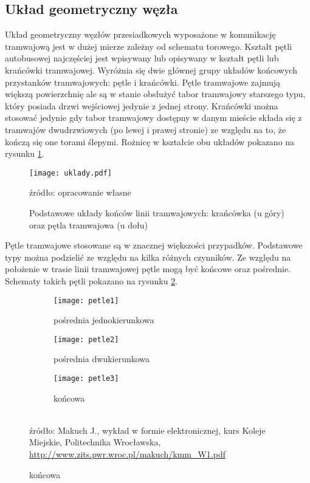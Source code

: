 \documentclass[twoside,12pt]{article}
\begin{document}
	\clearpage
	\subsection{Układ geometryczny węzła}
	
	Układ geometryczny węzłów przesiadkowych wyposażone w komunikację tramwajową jest w dużej mierze zależny od schematu torowego. Kształt pętli autobusowej najczęściej jest wpisywany lub opisywany w kształt pętli lub krańcówki tramwajowej. Wyróżnia się dwie głównej grupy układów końcowych przystanków tramwajowych: pętle i krańcówki. Pętle tramwajowe zajmują większą powierzchnię ale są w stanie obsłużyć tabor tramwajowy starszego typu, który posiada drzwi wejściowej jedynie z jednej strony. Krańcówki można stosować jedynie gdy tabor tramwajowy dostępny w danym mieście składa się z tramwajów dwudrzwiowych (po lewej i prawej stronie) ze względu na to, że kończą się one torami ślepymi. Rożnicę w kształcie obu układów pokazano na rysunku \ref{uklady}.
	
	\begin{figure}[H]
		\centering
		\caption{Podstawowe układy końców linii tramwajowych: krańcówka (u góry) oraz pętla tramwajowa (u dołu)}
		\texttt{[image: uklady.pdf]}\\
		\label{uklady}
		
		\footnotesize{źródło: opracowanie własne}
	\end{figure}
	
	Pętle tramwajowe stosowane są w znacznej większości przypadków. Podstawowe typy można podzielić ze względu na kilka różnych czynników. Ze względu na położenie w trasie linii tramwajowej pętle mogą być końcowe oraz pośrednie. Schematy takich pętli pokazano na rysunku \ref{petle1}.
	
	\begin{figure}[H]
	\centering
	\caption{Podział pętli tramwajowych ze względu na położenia w trasie}
	\begin{subfigure}{.33\textwidth}
	  \centering
	  \caption{pośrednia jednokierunkowa}
	  \texttt{[image: petle1]}
	\end{subfigure}%
	\begin{subfigure}{.33\textwidth}
	  \centering
	  \caption{pośrednia dwukierunkowa}
	  \texttt{[image: petle2]}
	\end{subfigure}%
	\begin{subfigure}{.33\textwidth}
	  \centering
	  \caption{końcowa}
	  \texttt{[image: petle3]}
	\end{subfigure}
	\label{petle1}\\
	\footnotesize{źródło: Makuch J., wykład w formie elektronicznej, kurs Koleje Miejskie, Politechnika Wrocławska, \url{http://www.zits.pwr.wroc.pl/makuch/kmm_W1.pdf} \cite{makuch}}
	\end{figure}
\end{document}
